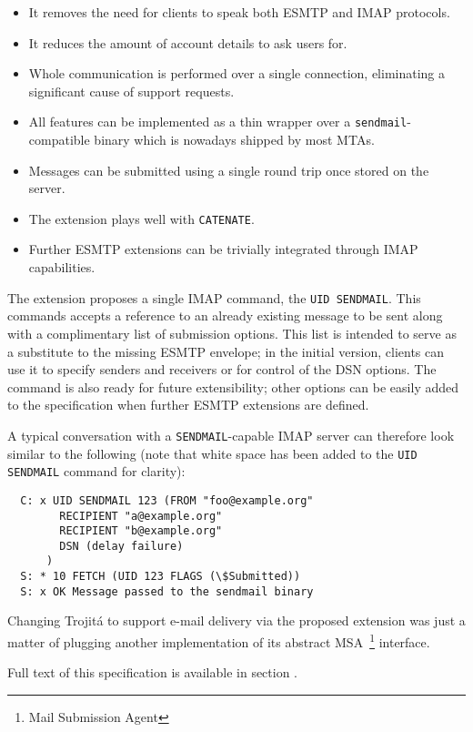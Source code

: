 \documentclass[trojita]{subfiles}
\begin{document}
\begin{itemize}
  \item It removes the need for clients to speak both ESMTP and IMAP protocols.
  \item It reduces the amount of account details to ask users for.
  \item Whole communication is performed over a single connection, eliminating a significant cause of support requests.
  \item All features can be implemented as a thin wrapper over a {\tt sendmail}-compatible binary which is nowadays
    shipped by most MTAs.
  \item Messages can be submitted using a single round trip once stored on the server.
  \item The extension plays well with {\tt CATENATE}.
  \item Further ESMTP extensions can be trivially integrated through IMAP capabilities.
\end{itemize}

The extension proposes a single IMAP command, the {\tt UID SENDMAIL}.  This commands accepts a reference to an already
existing message to be sent along with a complimentary list of submission options.  This list is intended to serve as a
substitute to the missing ESMTP envelope; in the initial version, clients can use it to specify senders and receivers or
for control of the DSN options.  The command is also ready for future extensibility; other options can be easily added
to the specification when further ESMTP extensions are defined.

A typical conversation with a {\tt SENDMAIL}-capable IMAP server can therefore look similar to the following (note that
white space has been added to the {\tt UID SENDMAIL} command for clarity):

\begin{verbatim}
  C: x UID SENDMAIL 123 (FROM "foo@example.org"
        RECIPIENT "a@example.org"
        RECIPIENT "b@example.org"
        DSN (delay failure)
      )
  S: * 10 FETCH (UID 123 FLAGS (\$Submitted))
  S: x OK Message passed to the sendmail binary
\end{verbatim}

Changing Trojitá to support e-mail delivery via the proposed extension was just a matter of plugging another
implementation of its abstract MSA~\footnote{Mail Submission Agent} interface.

Full text of this specification is available in section .
\end{document}
